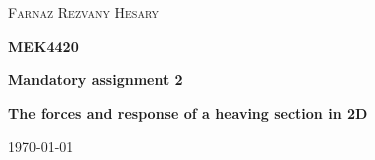 \documentclass[12pt,a4paper]{report}
\begin{document}
\begin{titlepage}
	\centering
	\vspace*{3cm}
	{\scshape\LARGE Farnaz Rezvany Hesary \par}
	\vspace{1.5cm}
	{\huge\bfseries MEK4420 \par}
	\vspace{1.5cm}
	{\huge\bfseries Mandatory assignment 2 \par}
	\vspace{1.5cm}
	{\LARGE\bfseries The forces and response of a heaving section in 2D \par}
	
	\vfill

	{\Large \today\par}
\end{titlepage}
\end{document}
